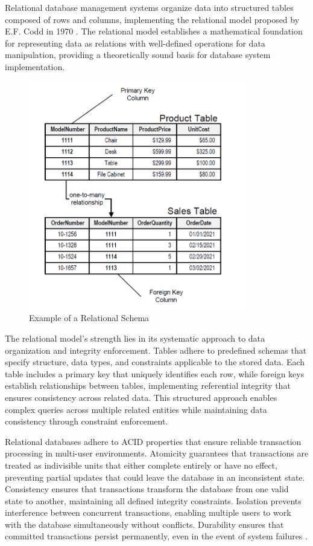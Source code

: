 Relational database management systems organize data into structured tables composed of rows and columns, implementing the relational model proposed by E.F. Codd in 1970 \cite{codd1970relational}. The relational model establishes a mathematical foundation for representing data as relations with well-defined operations for data manipulation, providing a theoretically sound basis for database system implementation.

\begin{figure}[ht]
    \centering
    \includegraphics[width=0.85\textwidth]{figures/relational_schema.png}
    \caption{Example of a Relational Schema \cite{noah2024relational}}
    \label{fig:relational-schema}
\end{figure}

The relational model's strength lies in its systematic approach to data organization and integrity enforcement. Tables adhere to predefined schemas that specify structure, data types, and constraints applicable to the stored data. Each table includes a primary key that uniquely identifies each row, while foreign keys establish relationships between tables, implementing referential integrity that ensures consistency across related data. This structured approach enables complex queries across multiple related entities while maintaining data consistency through constraint enforcement.

Relational databases adhere to ACID properties that ensure reliable transaction processing in multi-user environments. Atomicity guarantees that transactions are treated as indivisible units that either complete entirely or have no effect, preventing partial updates that could leave the database in an inconsistent state. Consistency ensures that transactions transform the database from one valid state to another, maintaining all defined integrity constraints. Isolation prevents interference between concurrent transactions, enabling multiple users to work with the database simultaneously without conflicts. Durability ensures that committed transactions persist permanently, even in the event of system failures \cite{sciore2009database}.

